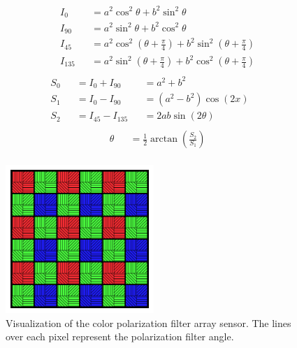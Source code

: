 \begin{minipage}{.48\textwidth}
    \begin{align*}
         & I_0     &  & =a^2\cos^2\theta + b^2\sin^2\theta                                 \\
         & I_{90}  &  & =a^2\sin^2\theta + b^2\cos^2\theta                                 \\
         & I_{45}  &  & =a^2\cos^2(\theta+\frac{\pi}{4}) + b^2\sin^2(\theta+\frac{\pi}{4}) \\
         & I_{135} &  & =a^2\sin^2(\theta+\frac{\pi}{4}) + b^2\cos^2(\theta+\frac{\pi}{4}) \\
    \end{align*}
    \begin{align*}
         & S_0 &  & = I_0     + I_{90}  &  & = a^2+b^2          &  & \\
         & S_1 &  & = I_0     - I_{90}  &  & =(a^2-b^2)\cos(2x) &  & \\
         & S_2 &  & = I_{45}  - I_{135} &  & =2ab\sin(2\theta)  &  & \\
    \end{align*}
    \begin{align*}
         & \theta &  & = \frac{1}{2}\arctan{\left(\frac{S_2}{S_1}\right)} \\
    \end{align*}
\end{minipage}%

\begin{figure}[H]
    \centering
    \includegraphics[width=0.5\textwidth]{figures/sensor/sensor_layout.pdf}
    \caption{Visualization of the color polarization filter array sensor. The lines over each pixel represent the polarization filter angle.}
    \label{fig:polarization_naming}
\end{figure}

